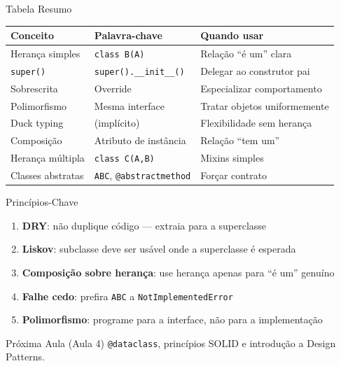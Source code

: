 \documentclass[aspectratio=169]{beamer}
\begin{document}
\begin{frame}{Tabela Resumo}
  \begin{center}
    \small
    \begin{tabular}{llp{6cm}}
      \toprule
      \textbf{Conceito} & \textbf{Palavra-chave} & \textbf{Quando usar} \\
      \midrule
      Herança simples   & \texttt{class B(A)} & Relação ``é um'' clara \\
      \texttt{super()}  & \texttt{super().\_\_init\_\_()} & Delegar ao construtor pai \\
      Sobrescrita       & Override             & Especializar comportamento \\
      Polimorfismo      & Mesma interface      & Tratar objetos uniformemente \\
      Duck typing       & (implícito)          & Flexibilidade sem herança \\
      Composição        & Atributo de instância & Relação ``tem um'' \\
      Herança múltipla  & \texttt{class C(A,B)} & Mixins simples \\
      Classes abstratas & \texttt{ABC}, \texttt{@abstractmethod} & Forçar contrato \\
      \bottomrule
    \end{tabular}
  \end{center}
\end{frame}

\begin{frame}{Princípios-Chave}
  \begin{enumerate}
    \item \textbf{DRY}: não duplique código — extraia para a superclasse
    \item \textbf{Liskov}: subclasse deve ser usável onde a superclasse é esperada
    \item \textbf{Composição sobre herança}: use herança apenas para ``é um'' genuíno
    \item \textbf{Falhe cedo}: prefira \texttt{ABC} a \texttt{NotImplementedError}
    \item \textbf{Polimorfismo}: programe para a interface, não para a implementação
  \end{enumerate}

  \bigskip

  \begin{exampleblock}{Próxima Aula (Aula 4)}
    \texttt{@dataclass}, princípios SOLID e introdução a Design Patterns.
  \end{exampleblock}
\end{frame}
\end{document}
